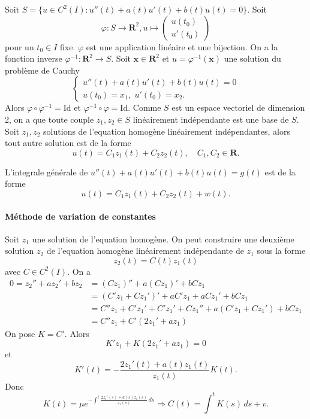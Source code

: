 Soit $S=\{ u\in C^{2}(I):u''(t)+a(t)u'(t)+b(t)u(t)=0 \}$. Soit $$\varphi:S\to \mathbf{R}^{2}, u\mapsto \begin{pmatrix}
u(t_{0}) \\
u'(t_{0})
\end{pmatrix}$$
pour un $t_{0}\in I$ fixe. $\varphi$ est une application linéaire et une bijection. On a la fonction inverse $\varphi ^{-1}:\mathbf{R}^{2}\to S$. Soit $\boldsymbol{x}\in \mathbf{R}^{2}$ et $u=\varphi ^{-1}(\boldsymbol{x})$ une solution du problème de Cauchy
$$
\begin{cases}
u''(t)+a(t)u'(t)+b(t)u(t)=0 \\
 u(t_{0})=x_{1}, \, \, u'(t_{0})=x_{2}.
\end{cases}
$$
Alors $\varphi \circ \varphi ^{-1}=\mathrm{Id}$ et $\varphi ^{-1} \circ \varphi = \mathrm{Id}$. Comme $S$ est un espace vectoriel de dimension 2, on a que toute couple $z_{1},z_{2}\in S$ linéairement indépendante est une base de $S$. Soit $z_{1},z_{2}$ solutions de l'equation homogène linéairement indépendantes, alors tout autre solution est de la forme
$$
u(t)=C_{1}z_{1}(t)+C_{2}z_{2}(t), \quad C_{1},C_{2}\in \mathbf{R}.
$$

L'integrale générale de $u''(t)+a(t)u'(t)+b(t)u(t)=g(t)$ est de la forme
$$
u(t)=C_{1}z_{1}(t)+C_{2}z_{2}(t)+w(t). 
$$

\paragraph{Méthode de variation de constantes} Soit $z_{1}$ une solution de l'equation homogène. On peut construire une deuxième solution $z_{2}$ de l'equation homogène linéairement indépendante de $z_{1}$ sous la forme 
$$
z_{2}(t)=C(t)z_{1}(t)
$$
avec $C\in C^{2}(I)$. On a 
\begin{align*}
0=z_{2}''+az_{2}'+bz_{2} & =(Cz_{1})''+a(Cz_{1})'+bCz_{1} \\
 & =(C'z_{1}+Cz_{1}' )'+aC'z_{1}+aCz_{1}'+bCz_{1}  \\
 & =C''z_{1}+C'z_{1}' +C'z_{1}'+Cz_{1}''+a(C'z_{1}+Cz_{1}')+bCz_{1}  \\
 & =C''z_{1}+C'(2z_{1}'+az_{1}) 
\end{align*}
On pose $K=C'$. Alors
$$
K'z_{1}+K(2z_{1}'+az_{1})=0
$$
et
$$
K'(t)=- \frac{2z_{1}'(t)+a(t)z_{1}(t)}{z_{1}(t)}K(t).
$$
Donc
$$
K(t)=\mu e^{ -\int ^{t} \frac{2z_{1}'(s)+a(s)z_{1}(s)}{z_{1}(s)}\,ds }\Rightarrow C(t)=\int ^{t}K(s)\,ds+v.
$$


